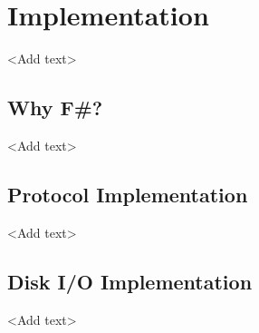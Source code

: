 \chapter{Implementation}\label{chp:impl}

<Add text>

\section{Why F\#?}

<Add text>

\section{Protocol Implementation}

<Add text>

\section{Disk I/O Implementation}

<Add text>